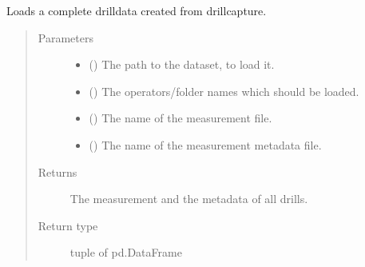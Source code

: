 \documentclass[letterpaper,10pt,english]{sphinxmanual}
\begin{document}
\begin{fulllineitems}
\label{\detokenize{anoog.io:anoog.io.csv_io.load_tsfresh}}
\sphinxAtStartPar
Loads a complete drill\sphinxhyphen{}data created from drillcapture.
\begin{quote}\begin{description}
\item[{Parameters}] \leavevmode\begin{itemize}
\item {} 
\sphinxAtStartPar
{} () \textendash{} The path to the dataset, to load it.

\item {} 
\sphinxAtStartPar
{} () \textendash{} The operators/folder names which should be loaded.

\item {} 
\sphinxAtStartPar
{} (\sphinxstyleliteralemphasis{\sphinxupquote{, }}) \textendash{} The name of the measurement file.

\item {} 
\sphinxAtStartPar
{} (\sphinxstyleliteralemphasis{\sphinxupquote{, }}) \textendash{} The name of the measurement metadata file.

\end{itemize}

\item[{Returns}] \leavevmode
\sphinxAtStartPar
The measurement and the metadata of all drills.

\item[{Return type}] \leavevmode
\sphinxAtStartPar
tuple of pd.DataFrame

\end{description}\end{quote}

\end{fulllineitems}
\end{document}
